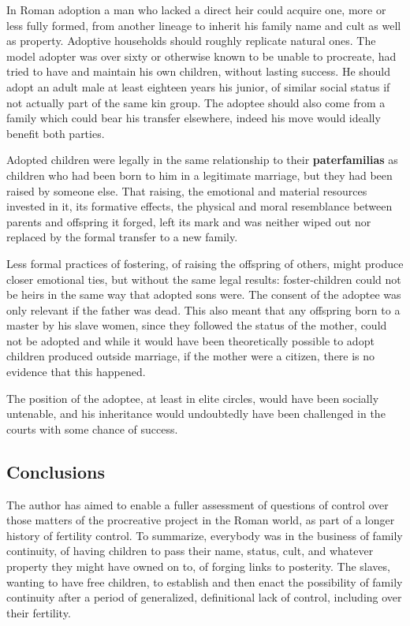 In Roman adoption a man who lacked a direct heir could acquire one, more or less fully formed, from another lineage to inherit his family name and cult as well as property. Adoptive households should roughly replicate natural ones. The model adopter was over sixty or otherwise known to be unable to procreate, had tried to have and maintain his own children, without lasting success. He should adopt an adult male at least eighteen years his junior, of similar social status if not actually part of the same kin group. The adoptee should also come from a family which could bear his transfer elsewhere, indeed his move would ideally benefit both parties.

\begin{rmk}
    Adopted children were legally in the same relationship to their \textbf{paterfamilias} as children who had been born to him in a legitimate marriage, but they had been raised by someone else. That raising, the emotional and material resources invested in it, its formative effects, the physical and moral resemblance between parents and offspring it forged, left its mark and was neither wiped out nor replaced by the formal transfer to a new family.
\end{rmk}

Less formal practices of fostering, of raising the offspring of others, might produce closer emotional ties, but without the same legal results: foster-children could not be heirs in the same way that adopted sons were. The consent of the adoptee was only relevant if the father was dead. This also meant that any offspring born to a master by his slave women, since they followed the status of the mother, could not be adopted and while it would have been theoretically possible to adopt children produced outside marriage, if the mother were a citizen, there is no evidence that this happened.

\begin{nte}
    The position of the adoptee, at least in elite circles, would have been socially untenable, and his inheritance would undoubtedly have been challenged in the courts with some chance of success.
\end{nte}


\subsection{Conclusions}

The author has aimed to enable a fuller assessment of questions of control over those matters of the procreative project in the Roman world, as part of a longer history of fertility control. To summarize, everybody was in the business of family continuity, of having children to pass their name, status, cult, and whatever property they might have owned on to, of forging links to posterity. The slaves, wanting to have free children, to establish and then enact the possibility of family continuity after a period of generalized, definitional lack of control, including over their fertility.

